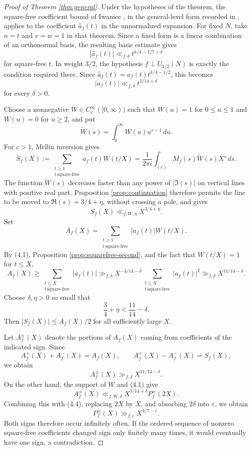 \documentclass[11pt]{amsart}
\theoremstyle{remark}
\begin{document}
\begin{proof}[Proof of Theorem \ref{thm:general}]
Under the hypotheses of the theorem, the square-free coefficient bound
of Iwaniec \cite{IwaniecCoeff}, in the general-level form recorded in
\cite[Theorem~1]{Waibel}, applies to the coefficient $\widehat a_f(t)$ in
the unnormalized expansion. For fixed $N$, take $n=t$ and $v=w=1$ in
that theorem. Since a fixed form is a linear combination of an
orthonormal basis, the resulting basis estimate gives
\[
|\widehat a_f(t)|\ll_{f,\delta}
t^{k/4-2/7+\delta}
\]
for square-free $t$. In weight $3/2$, the hypothesis
$f\perp U_{3/2}(N)$ is exactly the condition required there. Since
$\widehat a_f(t)=a_f(t)t^{k/4-1/2}$, this becomes
\[
|a_f(t)|\ll_{f,\delta}t^{3/14+\delta}
\tag{4.1}
\]
for every $\delta>0$.

Choose a nonnegative $W\in C_c^\infty([0,\infty))$ such that
$W(u)=1$ for $0\leq u\leq1$ and $W(u)=0$ for $u\geq2$, and put
\[
\widetilde W(s)=\int_0^\infty W(u)u^{s-1}\,du.
\]
For $c>1$, Mellin inversion gives
\[
S_f(X):=\sum_{\substack{t\ge1\\t\,\mathrm{square\text{-}free}}}
a_f(t)W(t/X)
=\frac{1}{2\pi i}\int_{(c)}M_f(s)\widetilde W(s)X^s\,ds.
\]
The function $\widetilde W(s)$ decreases faster than any power of
$|\Im(s)|$ on vertical lines with positive real part. Proposition
\ref{prop:continuation} therefore permits the line to be moved to
$\Re(s)=3/4+\eta$, without crossing a pole, and gives
\[
S_f(X)\ll_{f,W,\eta}X^{3/4+\eta}.
\tag{4.2}
\]
Set
\[
A_f(X)=\sum_{\substack{t\ge1\\ t\,\mathrm{square\text{-}free}}}|a_f(t)|W(t/X).
\]
By (4.1), Proposition \ref{prop:squarefree-second}, and the fact that
$W(t/X)=1$ for $t\le X$,
\[
A_f(X)
\ge \sum_{\substack{t\le X\\ t\,\mathrm{square\text{-}free}}}|a_f(t)|
\gg_{f,\delta}X^{-3/14-\delta}
\sum_{\substack{t\le X\\ t\,\mathrm{square\text{-}free}}}|a_f(t)|^2
\gg_{f,\delta}X^{11/14-\delta}.
\tag{4.3}
\]
Choose $\delta,\eta>0$ so small that
\[
\frac34+\eta<\frac{11}{14}-\delta.
\]
Then $|S_f(X)|\le A_f(X)/2$ for all sufficiently large $X$.

Let $A_f^\pm(X)$ denote the portions of $A_f(X)$ coming from coefficients of the indicated sign. Since
\[
A_f^+(X)+A_f^-(X)=A_f(X),
\qquad
A_f^+(X)-A_f^-(X)=S_f(X),
\]
we obtain
\[
A_f^\pm(X)\gg_{f,\delta}X^{11/14-\delta}.
\tag{4.4}
\]
On the other hand, the support of $W$ and (4.1) give
\[
A_f^\pm(X)\ll_{f,W,\delta}X^{3/14+\delta}P_f^\pm(2X).
\]
Combining this with (4.4), replacing $2X$ by $X$, and absorbing $2\delta$ into $\varepsilon$, we obtain
\[
P_f^\pm(X)\gg_{f,\varepsilon}X^{4/7-\varepsilon}.
\]
Both signs therefore occur infinitely often. If the ordered sequence of nonzero square-free coefficients changed sign only finitely many times, it would eventually have one sign, a contradiction.
\end{proof}
\end{document}
